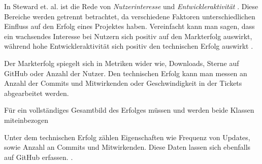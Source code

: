 In Steward et. al. ist die Rede von \textit{Nutzerinteresse} und \textit{Entwickleraktivität} %
\cite{stewartImpactsLicenseChoice2006a}. %
Diese Bereiche werden getrennt betrachtet, da verschiedene Faktoren unterschiedlichen Einfluss
auf den Erfolg eines Projektes haben.
Vereinfacht kann man sagen,
dass ein wachsendes Interesse bei Nutzern sich positiv auf den Markterfolg auswirkt,
während hohe Entwickleraktivität sich positiv den technischen Erfolg auswirkt
\cite{midhaFactorsAffectingSuccess2012, %
    stewartImpactsLicenseChoice2006a}. %

Der Markterfolg spiegelt sich in Metriken wider wie, Downloads, Sterne auf GitHub oder Anzahl der Nutzer.
Den technischen Erfolg kann man messen an Anzahl der Commits und Mitwirkenden oder
Geschwindigkeit in der Tickets abgearbeitet werden.


Für ein vollständiges Gesamtbild des Erfolges müssen und werden beide Klassen miteinbezogen




Unter dem technischen Erfolg zählen Eigenschaften wie Frequenz von Updates,
sowie Anzahl an Commits und Mitwirkenden. Diese Daten lassen sich ebenfalls auf GitHub erfassen.
\cite{midhaFactorsAffectingSuccess2012}. %

